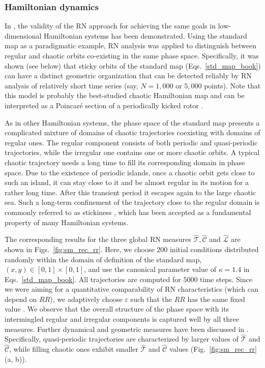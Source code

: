 \subsubsection{Hamiltonian dynamics}

		In \cite{Zou2016d}, the validity of the RN approach for achieving the same goals in low-dimensional Hamiltonian systems has been demonstrated. Using the standard map as a paradigmatic example, RN analysis was applied to distinguish between regular and chaotic orbits co-existing in the same phase space. Specifically, it was shown (see below) that sticky orbits of the standard map (Eqs.~\ref{std_map_book}) can have a distinct geometric organization that can be detected reliably by RN analysis of relatively short time series (say, $N=1,000$ or $5,000$ points). Note that this model is probably the best-studied chaotic Hamiltonian map and can be interpreted as a Poincar\'e section of a periodically kicked rotor \cite{Lichtenberg_Lieberman_regular,Meiss_rmp_1992}.

		As in other Hamiltonian systems, the phase space of the standard map presents a complicated mixture of domains of chaotic trajectories coexisting with domains of regular ones. The regular component consists of both periodic and quasi-periodic trajectories, while the irregular one contains one or more chaotic orbits. A typical chaotic trajectory needs a long time to fill its corresponding domain in phase space. Due to the existence of periodic islands, once a chaotic orbit gets close to such an island, it can stay close to it and be almost regular in its motion for a rather long time. After this transient period it escapes again to the large chaotic sea. Such a long-term confinement of the trajectory close to the regular domain is commonly referred to as stickiness \cite{Karney_physicaD_1983,Meiss_rmp_1992}, which has been accepted as a fundamental property of many Hamiltonian systems.

The corresponding results for the three global RN measures $\hat{\mathcal{T}}, \hat{\mathcal{C}}$ and $\hat{\mathcal{L}}$ are shown in Figs.~\ref{fig:sm_rec_rr}. Here, we choose 200 initial conditions distributed randomly within the domain of definition of the standard map, $(x,y) \in [0, 1] \times [0, 1]$, and use the canonical parameter value of $\kappa = 1.4$ in Eqs.~\eqref{std_map_book}. All trajectories are computed for $5000$ time steps. Since we were aiming for a quantitative comparability of RN characteristics (which can depend on $RR$), we adaptively choose $\varepsilon$ such that the $RR$ has the same fixed value \cite{Zou2016d}. We observe that the overall structure of the phase space with its intermingled regular and irregular components is captured well by all three measures. Further dynamical and geometric measures have been discussed in \cite{Zou2016d}. Specifically, quasi-periodic trajectories are characterized by larger values of $\hat{\mathcal{T}}$ and $\hat{\mathcal{C}}$, while filling chaotic ones exhibit smaller $\hat{\mathcal{T}}$ and $\hat{\mathcal{C}}$ values (Fig.~\ref{fig:sm_rec_rr}(a, b)).


